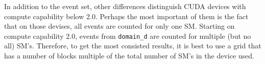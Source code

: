 In addition to the event set, other differences distinguish CUDA devices with compute capability below 2.0. Perhaps the most important of them is the fact that on those devises, all events are counted for only one SM. Starting on compute capability 2.0, events from \texttt{domain\_d} are counted for multiple (but no all) SM's. Therefore, to get the most consisted results, it is best to use a grid that has a number of blocks multiple of the total number of SM's in the device used.
